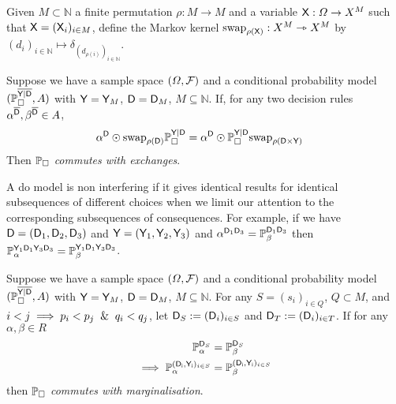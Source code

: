 \begin{definition}
Given $M\subset \mathbb{N}$ a finite permutation $\rho:M\to M$ and a variable $\mathsf{X}:\Omega\to X^M$ such that $\mathsf{X}=(\mathsf{X}_i)_{i\in M}$, define the Markov kernel $\text{swap}_{\rho(\mathsf{X})}:X^M\rightarrowtriangle X^M$ by $(d_i)_{i\in\mathbb{N}}\mapsto \delta_{(d_{\rho(i)})_{i\in\mathbb{N}}}$.
\end{definition}

\begin{definition}\label{def:caus_exch}
Suppose we have a sample space $(\Omega,\mathcal{F})$ and a conditional probability model $(\mathbb{P}_{\square}^{\overline{\mathsf{Y}|\mathsf{D}}},A)$ with $\mathsf{Y}=\mathsf{Y}_M$, $\mathsf{D}=\mathsf{D}_M$, $M\subseteq \mathbb{N}$. If, for any two decision rules $\alpha^{\overline{\mathsf{D}}},\beta^{\overline{\mathsf{D}}} \in A$,
\begin{align}
    \alpha^{\mathsf{D}}\odot \text{swap}_{\rho(\mathsf{D})} \mathbb{P}_{\square}^{\mathsf{Y}|\mathsf{D}} &= \alpha^{\mathsf{D}}\odot \mathbb{P}_{\square}^{\mathsf{Y}|\mathsf{D}}\text{swap}_{\rho(\mathsf{D}\times \mathsf{Y})}
\end{align}
Then $\mathbb{P}_\square$ \emph{commutes with exchanges}.
\end{definition}

A do model is non interfering if it gives identical results for identical subsequences of different choices when we limit our attention to the corresponding subsequences of consequences. For example, if we have $\mathsf{D}=(\mathsf{D}_1,\mathsf{D}_2,\mathsf{D}_3)$ and $\mathsf{Y}=(\mathsf{Y}_1,\mathsf{Y}_2,\mathsf{Y}_3)$ and $\alpha^{\mathsf{D}_1\mathsf{D}_3}=\mathbb{P}_\beta^{\mathsf{D}_1\mathsf{D}_3}$ then $\mathbb{P}_{\alpha}^{\mathsf{Y}_1\mathsf{D}_1\mathsf{Y}_3\mathsf{D}_3}=\mathbb{P}_\beta^{\mathsf{Y}_1\mathsf{D}_1\mathsf{Y}_3\mathsf{D}_3}$.

\begin{definition}\label{def:caus_cont}
Suppose we have a sample space $(\Omega,\mathcal{F})$ and a conditional probability model $(\mathbb{P}_{\square}^{\overline{\mathsf{Y}|\mathsf{D}}},A)$ with $\mathsf{Y}=\mathsf{Y}_M$, $\mathsf{D}=\mathsf{D}_M$, $M\subseteq \mathbb{N}$. For any $S=(s_i)_{i\in Q}$, $Q\subset M$, and $i<j\implies p_i<p_j \And q_i<q_j$, let $\mathsf{D}_S:=(\mathsf{D}_i)_{i\in S}$ and $\mathsf{D}_T:=(\mathsf{D}_i)_{i\in T}$. If for any $\alpha,\beta\in R$
\begin{align}
    \mathbb{P}_\alpha^{\mathsf{D}_{S}}&=\mathbb{P}_\beta^{\mathsf{D}_{S}}\\
    \implies \mathbb{P}_\alpha^{(\mathsf{D_i,Y_i})_{i\in S}}&=\mathbb{P}_\beta^{(\mathsf{D_i,Y_i})_{i\in S}}
\end{align}
then $\mathbb{P}_\square$ \emph{commutes with marginalisation}.
\end{definition}

